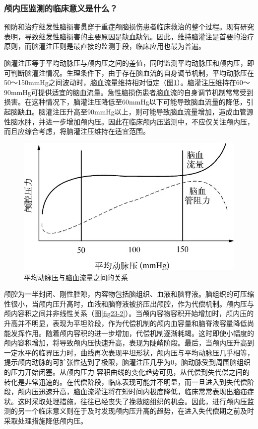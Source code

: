 \subsubsection{颅内压监测的临床意义是什么？}

预防和治疗继发性脑损害贯穿于重症颅脑损伤患者临床救治的整个过程。现有研究表明，导致继发性脑损害的主要原因是缺血缺氧。因此，维持脑灌注是首要的治疗原则，而脑灌注压则是最直接的监测手段，临床应用也最为普遍。

脑灌注压等于平均动脉压与颅内压之间的差值，同时监测平均动脉压和颅内压，即可判断脑灌注情况。生理条件下，由于存在脑血流的自身调节机制，平均动脉压在50～150mmHg之间波动时，脑血流量维持相对恒定（图\ref{fig23-1}）。脑灌注压维持在60～90mmHg可提供适宜的脑血流量。急性脑损伤患者脑血流的自身调节机制常常受到损害。在这种情况下，脑灌注压降低至60mmHg以下可能导致脑血流量的降低，引起脑缺血。脑灌注压升高至90mmHg以上，则可能导致脑血流量增加，造成血管源性脑水肿，并进一步增加颅内压。因此在临床颅内压监测中，不应仅关注颅内压，而且应综合考虑，将脑灌注压维持在适宜范围。

\begin{figure}[!htbp]
 \centering
 \includegraphics{./images/Image00264.jpg}
 \captionsetup{justification=centering}
 \caption{平均动脉压与脑血流量之间的关系}
 \label{fig23-1}
  \end{figure} 

颅腔为一半封闭、刚性腔隙，内容物包括脑组织、血液和脑脊液。脑组织的可压缩性很小，当颅内压升高时，血液和脑脊液被挤压出颅腔，作为代偿机制。颅内压与颅内容积之间并非线性关系（图\ref{fig23-2}）。当颅内容物容积开始增加时，颅内压的升高并不明显，表现为平坦阶段，作为代偿机制的颅内血容量和脑脊液容量降低尚能发挥作用。随着颅内容积的进一步增加，代偿机制逐渐耗竭。这时即使小幅度的颅内容积增加，将导致颅内压快速升高，表现为陡峭阶段。最后，当颅内压升高到一定水平的临界压力时，曲线再次表现平坦形状，颅内压与平均动脉压几乎相等，提示颅内动脉的可扩张性达到了极限，脑灌注压几乎为0，脑动脉受到周围脑组织的压力开始闭塞。从颅内压力-容积曲线的变化趋势可见，从代偿到失代偿之间的转化是非常迅速的。在代偿阶段，临床表现可能并不明显，而一旦进入到失代偿阶段，颅内压迅速升高，脑血流灌注将在短时间内极度降低，临床常常表现出脑疝症状。这时采取处理措施，往往已经丧失了挽救脑组织的机会。因此，进行颅内压监测的另一个临床意义则在于及时发现颅内压升高的趋势，在进入失代偿期之前及时采取处理措施降低颅内压。

